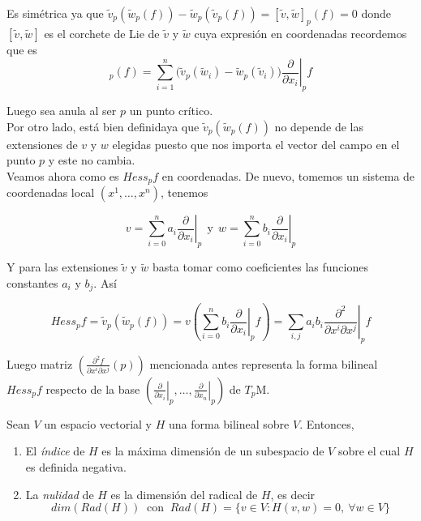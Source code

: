 Es simétrica ya que $\tilde{v}_{p}(\tilde{w}_{p}(f)) - \tilde{w}_{p}(\tilde{v}_{p}(f)) = [\tilde{v},\tilde{w}]_{p}(f) = 0$ donde $[\tilde{v},\tilde{w}]$ es el corchete de Lie de $\tilde{v}$ y $\tilde{w}$ cuya expresión en coordenadas recordemos que es
\begin{equation*}
    [\tilde{v},\tilde{w}]_{p}(f)=\sum_{i=1}^n \big( \tilde{v}_p(\tilde{w}_{i}) - \tilde{w}_p(\tilde{v}_{i}) \big) \left. \frac{\partial}{\partial x_{i}}\right|_p f
\end{equation*}

Luego sea anula al ser $p$ un punto crítico.\\

Por otro lado, está bien definidaya que $\tilde{v}_{p}(\tilde{w}_{p}(f))$ no depende de las extensiones de $v$ y $w$ elegidas puesto que nos importa el vector del campo en el punto $p$ y este no cambia.\\

Veamos ahora como es $Hess_pf$ en coordenadas. De nuevo, tomemos un sistema de coordenadas local $(x^{1}, \dots ,x^{n})$, tenemos

\begin{equation*}
    v=\sum_{i=0}^n a_i \left.\frac{\partial}{\partial x_i}\right|_p ~~\text{y}~~ w=\sum_{i=0}^n b_i \left.\frac{\partial}{\partial x_i}\right|_p 
\end{equation*}

Y para las extensiones $\tilde{v}$ y $\tilde{w}$ basta tomar como coeficientes las funciones constantes $a_i$ y $b_j$. Así

\begin{equation*}
    Hess_pf= \tilde{v}_{p}(\tilde{w}_{p}(f)) = v\left(\sum_{i=0}^n b_i \left.\frac{\partial}{\partial x_i}\right|_p f\right)=\sum_{i,j} a_ib_i\left.\frac{\partial^{2}}{\partial x^i \partial x^j}\right|_p f 
\end{equation*}

Luego matriz $\left(\frac{\partial^{2}f}{\partial x^i \partial x^j}(p)\right)$ mencionada antes representa la forma bilineal $Hess_pf$ respecto de la base $\left( \left.\frac{\partial}{\partial x_i}\right|_p,\dots, \left.\frac{\partial}{\partial x_n}\right|_p \right)$ de $T_p\mathrm{M}$.
\bigskip

\begin{definition}
    Sean $V$ un espacio vectorial y $H$ una forma bilineal sobre $V$. Entonces,
    
    \begin{enumerate}[label=\roman*)]
        \item El \textit{índice} de $H$ es la máxima dimensión de un subespacio de $V$ sobre el cual $H$ es definida negativa.
        
        \item La \textit{nulidad} de $H$ es la dimensión del radical de $H$, es decir
        \begin{equation*}
            dim(Rad(H)) ~\text{ con }~ Rad(H)=\{v\in V:H(v,w)=0, ~\forall w\in V \}
        \end{equation*}
        
    \end{enumerate}
\end{definition}


